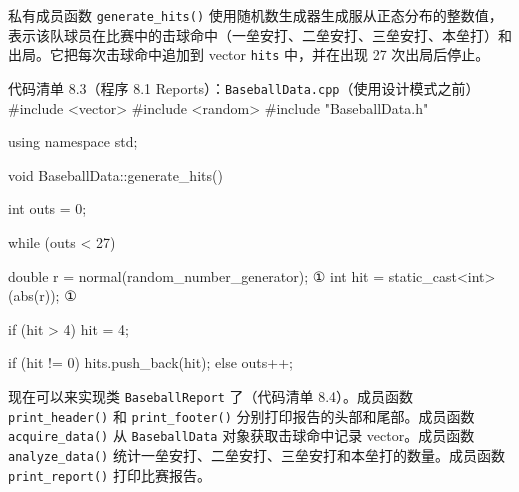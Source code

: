 私有成员函数 \texttt{generate\_\allowbreak{}hits(\allowbreak{})\allowbreak{}} 使用随机数生成器生成服从正态分布的整数值，表示该队球员在比赛中的击球命中（一垒安打、二垒安打、三垒安打、本垒打）和出局。它把每次击球命中追加到 vector \texttt{hits} 中，并在出现 27 次出局后停止。

\begin{codeboxt}{代码清单 8.3（程序 8.1 Reports）：\texttt{Baseball\allowbreak{}Data.\allowbreak{}cpp}（使用设计模式之前）}
#include <vector>
#include <random>
#include "BaseballData.h"

using namespace std;

void BaseballData::generate_hits()
{
    int outs = 0;

    while (outs < 27)
    {
        double r   = normal(random_number_generator);    ①
        int    hit = static_cast<int>(abs(r));           ①

        if (hit > 4) hit = 4;

        if (hit != 0) hits.push_back(hit);
        else          outs++;
    }
}
\end{codeboxt}
\par

现在可以来实现类 \texttt{Baseball\allowbreak{}Report} 了（代码清单 8.4）。成员函数 \texttt{print\_\allowbreak{}header(\allowbreak{})\allowbreak{}} 和 \texttt{print\_\allowbreak{}footer(\allowbreak{})\allowbreak{}} 分别打印报告的头部和尾部。成员函数 \texttt{acquire\_\allowbreak{}data(\allowbreak{})\allowbreak{}} 从 \texttt{Baseball\allowbreak{}Data} 对象获取击球命中记录 vector。成员函数 \texttt{analyze\_\allowbreak{}data(\allowbreak{})\allowbreak{}} 统计一垒安打、二垒安打、三垒安打和本垒打的数量。成员函数 \texttt{print\_\allowbreak{}report(\allowbreak{})\allowbreak{}} 打印比赛报告。


